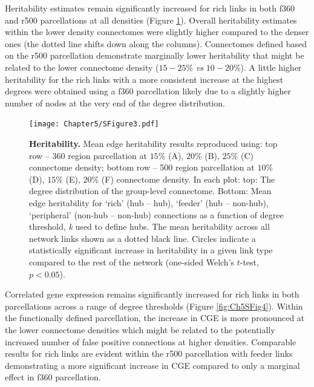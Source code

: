 \clearpage
Heritability estimates remain significantly increased for rich links in both f360 and r500 parcellations at all densities (Figure \ref{fig:Ch5SFig3}). Overall heritability estimates within the lower density connectomes were slightly higher compared to the denser ones (the dotted line shifts down along the columns). Connectomes defined based on the r500 parcellation demonstrate marginally lower heritability that might be related to the lower connectome density ($15-25\%$ \textit{vs} $10-20\%$). A little higher heritability for the rich links with a more consistent increase at the highest degrees were obtained using a f360 parcellation likely due to a slightly higher number of nodes at the very end of the degree distribution.

\begin{figure}[h!]
\begin{center}
\texttt{[image: Chapter5/SFigure3.pdf]}%
\end{center}
\caption{\textbf{Heritability.}
Mean edge heritability results reproduced using: top row -- 360 region parcellation at $15\%$ (A), $20\%$ (B), $25\%$ (C) connectome density; bottom row -- 500 region parcellation at $10\%$ (D), $15\%$ (E), $20\%$ (F) connectome density. In each plot: top: The degree distribution of the group-level connectome. Bottom: Mean edge heritability for `rich' (hub -- hub), `feeder' (hub -- non-hub), `peripheral' (non-hub -- non-hub) connections as a function of degree threshold, \textit{k} used to define hubs. The mean heritability across all network links shown as a dotted black line. Circles indicate a statistically significant increase in heritability in a given link type compared to the rest of the network (one-sided Welch's $t$-test, $p < 0.05$).}
\label{fig:Ch5SFig3}
\end{figure}

\clearpage
Correlated gene expression remains significantly increased for rich links in both parcellations across a range of degree thresholds (Figure \ref{fig:Ch5SFig4}). Within the functionally defined parcellation, the increase in CGE is more pronounced at the lower connectome densities which might be related to the potentially increased number of false positive connections at higher densities. Comparable results for rich links are evident within the r500 parcellation with feeder links demonstrating a more significant increase in CGE compared to only a marginal effect in f360 parcellation.

